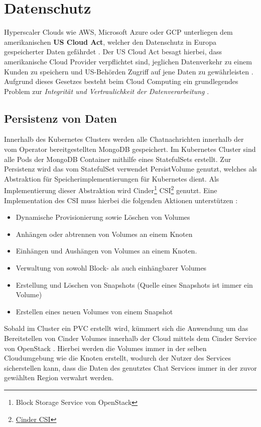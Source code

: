 \chapter{Datenschutz}
\label{chapter:datenschutz}
Hyperscaler Clouds wie \ac{AWS}, Microsoft Azure oder \ac{GCP} unterliegen dem amerikanischen \textbf{US Cloud Act}, welcher
den Datenschutz in Europa gespeicherter Daten gefährdet \cite{Kagermann2021}. Der US Cloud Act besagt hierbei,
dass amerikanische Cloud Provider verpflichtet sind, jeglichen Datenverkehr zu einem Kunden zu speichern und 
US-Behörden Zugriff auf jene Daten zu gewährleisten \cite{CloudAct2018}.
Aufgrund dieses Gesetzes besteht beim Cloud Computing ein grundlegendes Problem 
zur \emph{Integrität und Vertraulichkeit der Datenverarbeitung} \cite{Weichert2010}.


\section{Persistenz von Daten}
\label{subsec:datenschutz:persistenz}
Innerhalb des Kubernetes Clusters werden alle Chatnachrichten innerhalb der vom Operator bereitgestellten
MongoDB gespeichert. Im Kubernetes Cluster sind alle Pods der MongoDB Container mithilfe eines StatefulSets 
erstellt. Zur Persistenz wird das vom StatefulSet verwendet PersistVolume genutzt,
welches als Abstraktion für Speicherimplementierungen für Kubernetes dient.
Als Implementierung dieser Abstraktion wird 
Cinder\footnote{Block Storage Service von OpenStack} CSI\footnote{\href{https://github.com/kubernetes/cloud-provider-openstack/tree/master/pkg/csi/cinder}{Cinder CSI}} genutzt. 
Eine Implementation des \ac{CSI} muss hierbei die folgenden Aktionen unterstützen \cite{container-storage-interface_2021}:
\begin{itemize}
  \item Dynamische Provisionierung sowie Löschen von Volumes
  \item Anhängen oder abtrennen von Volumes an einem Knoten
  \item Einhängen und Aushängen von Volumes an einem Knoten.
  \item Verwaltung von sowohl Block- als auch einhängbarer Volumes
  \item Erstellung und Löschen von Snapshots (Quelle eines Snapshots ist immer ein Volume)
  \item Erstellen eines neuen Volumes von einem Snapshot
\end{itemize}

Sobald im Cluster ein \ac{PVC} erstellt wird, kümmert sich die Anwendung um das Bereitstellen von 
Cinder Volumes innerhalb der Cloud mittels dem Cinder Service von OpenStack \cite{cinderCSI}.
Hierbei werden die Volumes immer in der selben Cloudumgebung wie die Knoten erstellt, wodurch der 
Nutzer des Services sicherstellen kann, dass die Daten des genutztes Chat Services immer in der zuvor 
gewählten Region verwahrt werden.